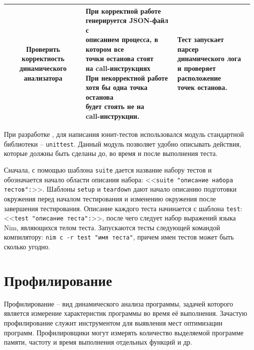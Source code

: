 \begin{table}
{\begin{longtable}{|c|l|l|}
                \makecell{Проверить корректность \\
                    динамического анализатора} & 
                \makecell[l]{
                    При корректной работе\\
                    генерируется JSON-файл с\\
                    описанием процесса, в котором все\\
                    точки останова стоят\\
                    на call-инструкциях
                    \\
                    При некорректной работе\\
                    хотя бы одна точка останова\\
                    будет стоять не на \\
                    call-инструкции.} & 
                \makecell[l]{Тест запускает парсер\\
                    динамического лога \\
                    и проверяет расположение\\
                    точек останова.}\\
                \hline
        \end{longtable}
    }
\end{table}

При разработке {\ProgModule}, для написания юнит-тестов использовался
модуль стандартной библиотеки -- \verb|unittest|. 
Данный модуль позволяет удобно описывать действия, которые должны быть
сделаны до, во время и после выполнения теста.

Сначала, с помощью шаблона \verb|suite| дается название набору тестов 
и обозначается начало области описания набора:
<<\verb|suite "описание набора тестов":|>>.
Шаблоны \verb|setup| и \verb|teardown| дают начало описанию подготовки
окружения перед началом тестирования и изменению окружения после завершения
тестирования. Описание каждого теста начинается с шаблона \verb|test|: 
<<\verb|test "описание теста":|>>, после чего следует набор выражений языка
Nim, являющихся телом теста.
Запускаются тесты следующей командой компилятору:
\verb|nim c -r test "имя теста"|, причем имен тестов может быть сколько угодно.


\section{Профилирование {\ProgModule}}\label{sec:ch3/sec1/sub3}
Профилирование -- вид динамического анализа программы, задачей которого
является измерение характеристик программы во время её выполнения.
Зачастую профилирование служит инструментом для выявления мест 
оптимизации программ. Профилировщики могут измерять количество выделяемой
программе памяти, частоту и время выполнения отдельных функций и др.

